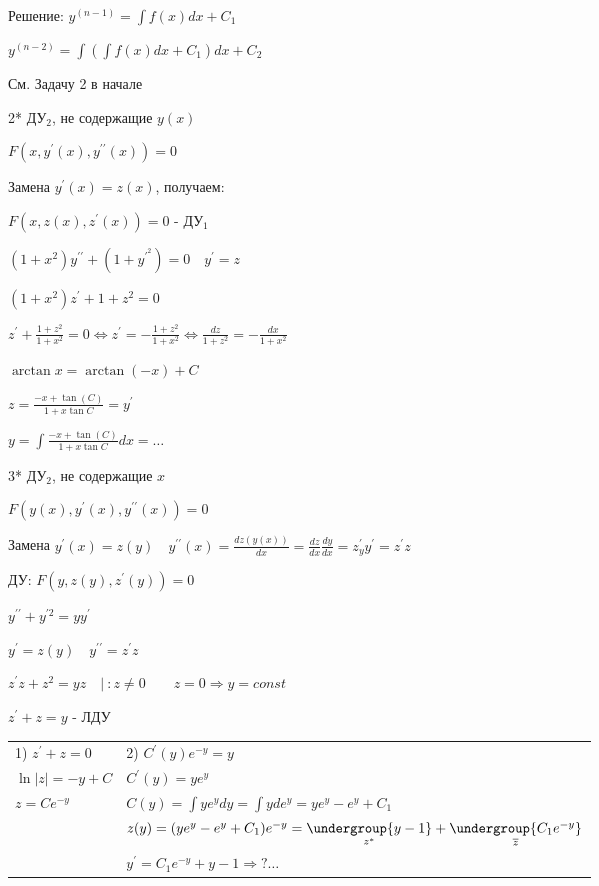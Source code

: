 \documentclass[12pt]{article}
\begin{document}
    Решение: $y^{(n - 1)} = \int f(x) dx + C_1$

    $y^{(n - 2)} = \int (\int f(x) dx + C_1) dx + C_2$

    \Ex См. Задачу 2 в начале

    2* ДУ$_2$, не содержащие $y(x)$

    $F(x, y^\prime(x), y^{\prime\prime}(x)) = 0$

    Замена $y^\prime(x) = z(x)$, получаем:

    $F(x, z(x), z^\prime(x)) = 0$ - ДУ$_1$

    \Ex $(1 + x^2)y^{\prime\prime} + (1 + y^\prime^2) = 0 \quad y^\prime = z$

    $(1 + x^2)z^\prime + 1 + z^2 = 0$

    $z^\prime + \frac{1 + z^2}{1 + x^2} = 0 \Longleftrightarrow z^\prime = -\frac{1 + z^2}{1 + x^2} \Longleftrightarrow \frac{dz}{1 + z^2} = -\frac{dx}{1 + x^2}$

    $\arctan x = \arctan(-x) + C$

    $z = \frac{-x + \tan(C)}{1 + x \tan C} = y^\prime$

    $y = \int \frac{-x + \tan(C)}{1 + x \tan C} dx = \dots $

    3* ДУ$_2$, не содержащие $x$

    $F(y(x), y^\prime(x), y^{\prime\prime}(x)) = 0$

    Замена $y^\prime(x) = z(y) \quad y^{\prime\prime}(x) = \frac{dz(y(x))}{dx} = \frac{dz}{dx} \frac{dy}{dx} = z^\prime_y y^\prime = z^\prime z$

    ДУ: $F(y, z(y), z^\prime(y)) = 0$

    \Ex $y^{\prime\prime} + y^{\prime 2} = yy^\prime$

    $y^\prime = z(y) \quad y^{\prime\prime} = z^\prime z$

    $z^\prime z + z^2 = yz \quad | \ : z \neq 0 \quad\quad z = 0 \Longrightarrow y = const$

    $z^\prime + z = y$ - ЛДУ

    \begin{tabular}{p{5cm}p{10cm}}
        1) $z^\prime + z = 0$ & 2) $C^\prime (y) e^{-y} = y$                                                                                              \\

        $\ln|z| = -y + C$     & $C^\prime (y) = ye^{y}$                                                                                                   \\

        $z = Ce^{-y}$         & $C(y) = \int y e^y dy = \int y de^y = ye^y - e^y + C_1$                                                                   \\

        & $z(y) = (ye^y - e^y + C_1)e^{-y} = \underset{z^*}{\undergroup{y - 1}} + \underset{\overline{z}}{\undergroup{C_1 e^{-y}}}$ \\

        & $y^\prime = C_1 e^{-y} + y - 1 \Longrightarrow ? \dots $

    \end{tabular}
\end{document}
